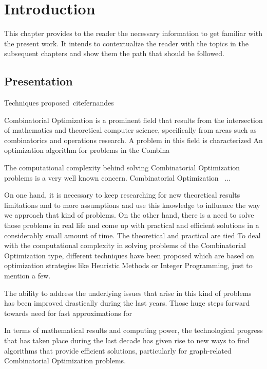 %
%
\let\textcircled=\pgftextcircled
\chapter{Introduction}
\label{Chapter1}

This chapter provides to the reader the necessary information to get familiar with the present work. It intends to contextualize the reader with the topics in the subsequent chapters and show them the path that should be followed.

\section{Presentation}

Techniques proposed~cite{fernandes}

Combinatorial Optimization is a prominent field that results from the intersection of mathematics and theoretical computer science, specifically from areas such as combinatorics and operations research. A problem in this field is characterized  An optimization algorithm for problems in the Combina~\cite{brilliant}

The computational complexity behind solving Combinatorial Optimization problems is a very well known concern. 
Combinatorial Optimization ~\cite{appcombinatorial}... 

On one hand, it is necessary to keep researching for new theoretical results limitations and to more assumptions and use this knowledge to influence the way we approach that kind of problems. On the other hand, there is a need to solve those problems in real life and come up with practical and efficient solutions in a considerably small amount of time. The theoretical and practical are tied
To deal with the computational complexity in solving problems of the Combinatorial Optimization type, different techniques have been proposed which are based on optimization strategies like Heuristic Methods or Integer Programming, just to mention a few.

The ability to address the underlying issues that arise in this kind of problems has been improved drastically during the last years. Those huge steps forward towards need for fast approximations for 

In terms of mathematical results and computing power, the technological progress that has taken place during the last decade has given rise to new ways to find algorithms that provide efficient solutions, particularly for graph-related Combinatorial Optimization problems.

